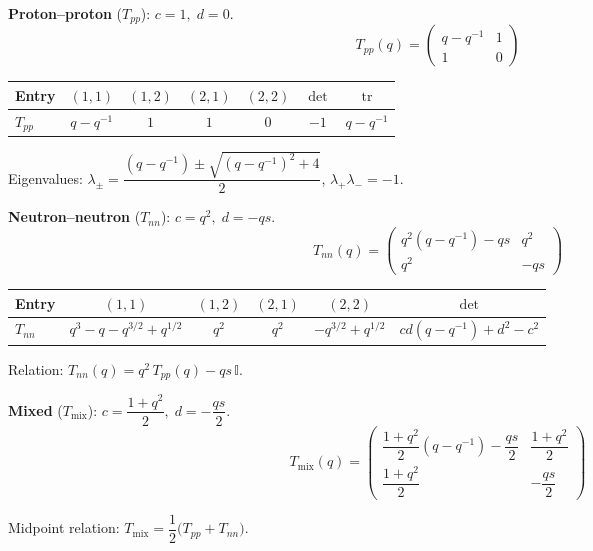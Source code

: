 \documentclass[12pt,a4paper]{article}
\newcommand{\II}{\mathbb{I}}
\begin{document}
\noindent\textbf{Proton--proton} ($T_{pp}$): $c = 1,\; d = 0$.
\[
  \boxed{T_{pp}(q)
  = \begin{pmatrix} q - q^{-1} & 1 \\ 1 & 0 \end{pmatrix}}
\]

\medskip

\begin{tabular}{@{} l c c c c c c @{}}
\toprule
\textbf{Entry} & $(1,1)$ & $(1,2)$ & $(2,1)$ & $(2,2)$ & $\det$ & $\operatorname{tr}$ \\
\midrule
$T_{pp}$ & $q - q^{-1}$ & $1$ & $1$ & $0$ & $-1$ & $q - q^{-1}$ \\
\bottomrule
\end{tabular}

\medskip

\noindent Eigenvalues:
$\lambda_\pm = \dfrac{(q - q^{-1}) \pm \sqrt{(q - q^{-1})^2 + 4}}{2}$,
\quad $\lambda_+\lambda_- = -1$.

\bigskip

\noindent\textbf{Neutron--neutron} ($T_{nn}$): $c = q^2,\; d = -qs$.
\[
  \boxed{T_{nn}(q)
  = \begin{pmatrix}
      q^2(q - q^{-1}) - qs & q^2 \\
      q^2 & -qs
    \end{pmatrix}}
\]

\medskip

\begin{tabular}{@{} l c c c c c @{}}
\toprule
\textbf{Entry} & $(1,1)$ & $(1,2)$ & $(2,1)$ & $(2,2)$ & $\det$ \\
\midrule
$T_{nn}$ & $q^3 - q - q^{3/2} + q^{1/2}$ & $q^2$ & $q^2$ & $-q^{3/2} + q^{1/2}$ & $cd(q\!-\!q^{-1})\!+\!d^2\!-\!c^2$ \\
\bottomrule
\end{tabular}

\medskip

\noindent Relation:
$T_{nn}(q) = q^2\, T_{pp}(q) - qs\,\II$.

\bigskip

\noindent\textbf{Mixed} ($T_{\mathrm{mix}}$):
$c = \dfrac{1 + q^2}{2},\; d = -\dfrac{qs}{2}$.
\[
  \boxed{T_{\mathrm{mix}}(q)
  = \begin{pmatrix}
      \dfrac{1+q^2}{2}(q - q^{-1}) - \dfrac{qs}{2}
        & \dfrac{1+q^2}{2} \\[6pt]
      \dfrac{1+q^2}{2}
        & -\dfrac{qs}{2}
    \end{pmatrix}}
\]

\noindent Midpoint relation:
$T_{\mathrm{mix}} = \dfrac{1}{2}\bigl(T_{pp} + T_{nn}\bigr)$.
\end{document}
